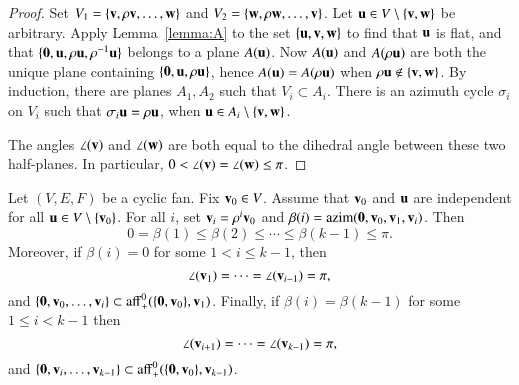 \begin{proof}   Set $V_1 = \{{\mathbf v},\rho {\mathbf v},\ldots,{\mathbf w}\}$ and $V_2 = \{{\mathbf w},\rho {\mathbf w},\ldots,{\mathbf v}\}$. 
Let ${\mathbf u}\in V\setminus\{{\mathbf v},{\mathbf w}\}$ be arbitrary.
Apply Lemma~\ref{lemma:A} to the set $\{{\mathbf u},{\mathbf v},{\mathbf w}\}$ to find that ${\mathbf u}$ is flat, and
that $\{{\mathbf 0},{\mathbf u},\rho {\mathbf u},\rho^{-1} {\mathbf u}\}$ belongs to a plane $A({\mathbf u})$.  Now $A({\mathbf u})$ and $A(\rho {\mathbf u})$ are both the unique plane containing $\{{\mathbf 0},{\mathbf u},\rho {\mathbf u}\}$, hence $A({\mathbf u}) = A(\rho {\mathbf u})$ 
when $\rho {\mathbf u}\not\in \{{\mathbf v},{\mathbf w}\}$.  By induction, there are planes $A_1, A_2$ such that $V_i\subset A_i$.  There is
an azimuth cycle $\sigma_i$ on $V_i$ such that $\sigma_i {\mathbf u} = \rho {\mathbf u}$, when ${\mathbf u} \in A_i\setminus \{{\mathbf v},{\mathbf w}\}$.  

The angles $\angle({\mathbf v})$ and $\angle({\mathbf w})$ are both equal to the dihedral angle between these two half-planes.  In particular, $0<\angle({\mathbf v})=\angle({\mathbf w})\le\pi$.
\end{proof}




\begin{lemma}[monotonicity]  \label{lemma:monotone}
Let $(V,E,F)$ be a cyclic fan. Fix ${\mathbf v}_0\in V$.  Assume that ${\mathbf v}_0$ and ${\mathbf u}$ are independent for all ${\mathbf u}\in V\setminus\{{\mathbf v}_0\}$.  For all $i$, set ${\mathbf v}_i = \rho^i {\mathbf v}_0$ and $\beta(i) = {\operatorname{azim}}({\mathbf 0},{\mathbf v}_0,{\mathbf v}_1,{\mathbf v}_i)$.
Then
$$0=\beta(1)\le \beta(2)\le \cdots\le \beta(k-1)\le\pi.$$
Moreover, if $\beta(i)=0$ for some $1<i \le k-1$, then
$$
\angle({\mathbf v}_1) = \cdots = \angle({\mathbf v}_{i-1}) = \pi,
$$
and $\{{\mathbf 0},{\mathbf v}_0,\ldots,{\mathbf v}_i\} \subset {\operatorname{aff}}^0_+(\{{\mathbf 0},{\mathbf v}_0\},{\mathbf v}_1)$.
Finally, if $\beta(i)=\beta(k-1)$ for some $1\le i<k-1$ then 
$$
\angle({\mathbf v}_{i+1}) = \cdots = \angle({\mathbf v}_{k-1}) = \pi,
$$
and $\{{\mathbf 0},{\mathbf v}_i,\ldots,{\mathbf v}_{k-1}\} \subset {\operatorname{aff}}^0_+(\{{\mathbf 0},{\mathbf v}_0\},{\mathbf v}_{k-1})$.
\end{lemma}

